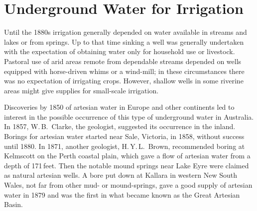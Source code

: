 
\chapter{Underground Water for Irrigation}

\label{ch:underground}

\setcounter{endnote}{0}

Until the 1880s irrigation generally depended on water available in
streams and lakes or from springs.  Up to that time sinking a well was
generally undertaken with the expectation of obtaining water only for
household use or livestock.  Pastoral use of arid areas remote from
dependable streams depended on wells equipped with
horse-driven whims or a wind-mill; in these circumstances
there was no expectation of irrigating crops.  However, shallow wells
in some riverine areas might give supplies for small-scale irrigation.

Discoveries by 1850 of artesian water  in
Europe and other continents led to interest in the
possible occurrence of this type of underground water in Australia.
In 1857, W.\,B.~Clarke,   the geologist,
suggested its occurrence in the inland. Borings for artesian water
started near Sale,  Victoria, in 1858, without
success until 1880.  In 1871, another geologist, H.\,Y.\,L.~Brown,
 recommended boring at Kelmscott
 on the Perth coastal plain, which gave a flow of
artesian water from a depth of 171\,feet.  Then the notable mound
springs  near Lake Eyre  were
claimed as natural artesian wells. A bore put
down at Kallara  in western New South Wales, not
far from other mud- or mound-springs, gave a good supply of artesian
water in 1879 and was the first in what became known as the Great
Artesian 
Basin.

